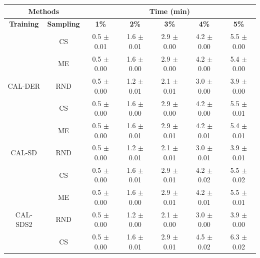 \begin{table}[htbp]
\centering

\begin{tabular*}{\linewidth}{c|c|@{\extracolsep{\fill}}ccccc}
\toprule
\multicolumn{2}{c|}{\textbf{Methods}} & \multicolumn{5}{c}{\textbf{Time (min)}} \\
\midrule
\textbf{Training} & \textbf{Sampling} & \textbf{1\%} & \textbf{2\%} & \textbf{3\%} & \textbf{4\%} & \textbf{5\%}\\
\midrule
 & CS & 0.5 $\pm$ {\small 0.01} & 1.6 $\pm$ {\small 0.01} & 2.9 $\pm$ {\small 0.00} & 4.2 $\pm$ {\small 0.00} & 5.5 $\pm$ {\small 0.00}\\

 & ME & 0.5 $\pm$ {\small 0.00} & 1.6 $\pm$ {\small 0.00} & 2.9 $\pm$ {\small 0.00} & 4.2 $\pm$ {\small 0.00} & 5.4 $\pm$ {\small 0.00}\\

\multirow{-3}{*}{\raggedright\arraybackslash CAL-DER} & RND & 0.5 $\pm$ {\small 0.00} & 1.2 $\pm$ {\small 0.01} & 2.1 $\pm$ {\small 0.01} & 3.0 $\pm$ {\small 0.00} & 3.9 $\pm$ {\small 0.00}\\
\midrule
 & CS & 0.5 $\pm$ {\small 0.00} & 1.6 $\pm$ {\small 0.00} & 2.9 $\pm$ {\small 0.00} & 4.2 $\pm$ {\small 0.00} & 5.5 $\pm$ {\small 0.01}\\

 & ME & 0.5 $\pm$ {\small 0.00} & 1.6 $\pm$ {\small 0.01} & 2.9 $\pm$ {\small 0.01} & 4.2 $\pm$ {\small 0.01} & 5.4 $\pm$ {\small 0.01}\\

\multirow{-3}{*}{\raggedright\arraybackslash CAL-SD} & RND & 0.5 $\pm$ {\small 0.00} & 1.2 $\pm$ {\small 0.01} & 2.1 $\pm$ {\small 0.01} & 3.0 $\pm$ {\small 0.01} & 3.9 $\pm$ {\small 0.01}\\
\midrule
 & CS & 0.5 $\pm$ {\small 0.00} & 1.6 $\pm$ {\small 0.01} & 2.9 $\pm$ {\small 0.01} & 4.2 $\pm$ {\small 0.02} & 5.5 $\pm$ {\small 0.02}\\

 & ME & 0.5 $\pm$ {\small 0.00} & 1.6 $\pm$ {\small 0.00} & 2.9 $\pm$ {\small 0.01} & 4.2 $\pm$ {\small 0.01} & 5.5 $\pm$ {\small 0.01}\\

\multirow{-3}{*}{\raggedright\arraybackslash CAL-SDS2} & RND & 0.5 $\pm$ {\small 0.00} & 1.2 $\pm$ {\small 0.00} & 2.1 $\pm$ {\small 0.00} & 3.0 $\pm$ {\small 0.00} & 3.9 $\pm$ {\small 0.00}\\
\midrule
 & CS & 0.5 $\pm$ {\small 0.00} & 1.6 $\pm$ {\small 0.01} & 2.9 $\pm$ {\small 0.01} & 4.5 $\pm$ {\small 0.02} & 6.3 $\pm$ {\small 0.02}\\


\end{tabular*}
\end{table}

